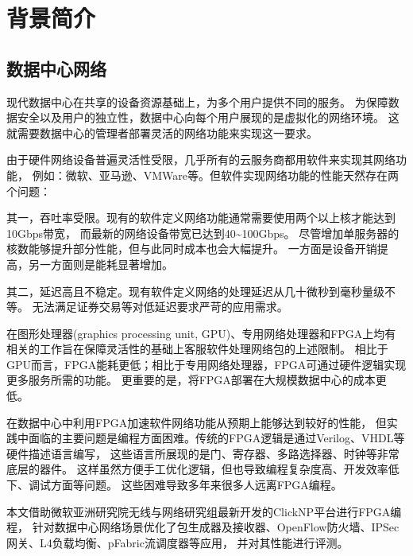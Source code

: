 \chapter{背景简介}
\section{数据中心网络}
现代数据中心在共享的设备资源基础上，为多个用户提供不同的服务。
为保障数据安全以及用户的独立性，数据中心向每个用户展现的是虚拟化的网络环境。
这就需要数据中心的管理者部署灵活的网络功能来实现这一要求。

由于硬件网络设备普遍灵活性受限，几乎所有的云服务商都用软件来实现其网络功能，
例如：微软、亚马逊、VMWare等。但软件实现网络功能的性能天然存在两个问题：

其一，吞吐率受限。现有的软件定义网络功能通常需要使用两个以上核才能达到10Gbps带宽，
而最新的网络设备带宽已达到40\textasciitilde 100Gbps。
尽管增加单服务器的核数能够提升部分性能，但与此同时成本也会大幅提升。
一方面是设备开销提高，另一方面则是能耗显著增加。

其二，延迟高且不稳定。现有软件定义网络的处理延迟从几十微秒到毫秒量级不等。
无法满足证券交易等对低延迟要求严苛的应用需求。

在图形处理器(graphics processing unit, GPU)、专用网络处理器和FPGA上均有相关的工作旨在保障灵活性的基础上客服软件处理网络包的上述限制。
相比于GPU而言，FPGA能耗更低；相比于专用网络处理器，FPGA可通过硬件逻辑实现更多服务所需的功能。
更重要的是，将FPGA部署在大规模数据中心的成本更低。

在数据中心中利用FPGA加速软件网络功能从预期上能够达到较好的性能，
但实践中面临的主要问题是编程方面困难。传统的FPGA逻辑是通过Verilog、VHDL等硬件描述语言编写，
这些语言所展现的是门、寄存器、多路选择器、时钟等非常底层的器件。
这样虽然方便手工优化逻辑，但也导致编程复杂度高、开发效率低下、调试方面等问题。
这些困难导致多年来很多人远离FPGA编程。

本文借助微软亚洲研究院无线与网络研究组最新开发的ClickNP平台进行FPGA编程，
针对数据中心网络场景优化了包生成器及接收器、OpenFlow防火墙、IPSec网关、L4负载均衡、pFabric流调度器等应用，
并对其性能进行评测。
%
%
%
%
%
